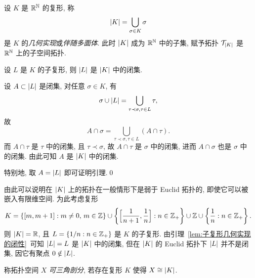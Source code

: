 	设 $ K $ 是 $ \mathbb{R}^{\mathbb{N}} $ 的复形, 称
    \[
        \left| K \right| =\bigcup_{\sigma\in K}\sigma
    \]
    是 $ K $ 的\emph{几何实现}或\emph{伴随多面体}. 此时 $ \left| K \right|  $ 成为 $ \mathbb{R}^{\mathbb{N}} $ 中的子集, 赋予拓扑 $ \mathcal{T}_{\left| K \right| } $ 是 $ \mathbb{R}^{\mathbb{N}} $ 上的子空间拓扑.

    \begin{Lemma}\label{lem:子复形几何实现的闭性}
        设 $ L $ 是 $ K $ 的子复形, 则 $ \left| L \right|  $ 是 $ \left| K \right|  $ 中的闭集.
    \end{Lemma}
    \begin{Proof}
        设 $ A\subset\left| L \right|  $ 是闭集, 对任意 $ \sigma\in K $, 有
        \[
            \sigma\cup\left| L \right| =\bigcup_{\tau\prec\sigma,\tau\in L}\tau,
        \]
        故
        \[
            A\cap\sigma=\bigcup_{\tau\prec\sigma,\tau\in L}(A\cap\tau).
        \]
        而 $ A\cap\tau $ 是 $ \tau $ 中的闭集, 且 $ \tau\prec\sigma $, 故 $ A\cap\tau $ 是 $ \sigma $ 中的闭集, 进而 $ A\cap\sigma $ 也是 $ \sigma $ 中的闭集. 由此可知 $ A $ 是 $ \left| K \right|  $ 中的闭集.

        特别地, 取 $ A=\left| L \right|  $ 即可证明引理.\qed
    \end{Proof}

    由此可以说明在 $ \left| K \right|  $ 上的拓扑在一般情形下是弱于 Euclid 拓扑的, 即使它可以被嵌入有限维空间. 为此考虑复形
    \[
        K=\left\{ [m,m+1] : m\ne 0,\,m\in\mathbb{Z} \right\}\cup\left\{ \Big[ \frac{1}{n+1},\frac{1}{n} \Big] : n\in\mathbb{Z}_+ \right\}\cup\mathbb{Z}\cup\left\{ \frac{1}{n} : n\in\mathbb{Z}_+ \right\}.
    \]
    则 $ \left| K \right| =\mathbb{R} $, 且 $ L=\left\{ 1/n : n\in\mathbb{Z}_+ \right\} $ 是 $ K $ 的子复形. 由引理~\ref{lem:子复形几何实现的闭性}~可知 $ \left| L \right| =L $ 是 $ \left| K \right|  $ 中的闭集, 但在 $ \left| K \right|  $ 的 Euclid 拓扑下 $ \left| L \right|  $ 并不是闭集, 因它有聚点 $ 0\notin\left| L \right|  $.

	\begin{Definition}[可三角剖分空间]
        称拓扑空间 $ X $ \emph{可三角剖分}, 若存在复形 $ K $ 使得 $ X\cong\left| K \right|  $.
    \end{Definition}

